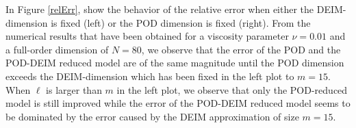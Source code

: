 In Figure \ref{relErr}, show the behavior of the relative error when either the DEIM-dimension is fixed (left) or the POD dimension is fixed (right). From the numerical results that have been obtained for a viscosity parameter $\nu = 0.01$ and a full-order dimension of $N = 80$, we observe that the error of the POD and the POD-DEIM reduced model are of the same magnitude until the POD dimension exceeds the DEIM-dimension which has been fixed in the left plot to $m = 15$. When $\ell$ is larger than $m$ in the left plot, we observe that only the POD-reduced model is still improved while the error of the POD-DEIM reduced model seems to be dominated by the error caused by the DEIM approximation of size $m = 15$. %
